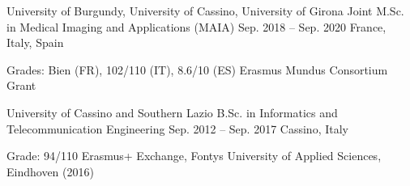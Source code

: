 

\begin{cventries}

  \cventry
    {University of Burgundy, University of Cassino, University of Girona} %
    {Joint M.Sc. in Medical Imaging and Applications (MAIA)} %
    {Sep. 2018 -- Sep. 2020}
    {France, Italy, Spain}
    {
      \begin{cvitems}
        \item {Grades: Bien (FR), 102/110 (IT), 8.6/10 (ES) \textbullet{} Erasmus Mundus Consortium Grant}
      \end{cvitems}
    }

  \cventry
    {University of Cassino and Southern Lazio} %
    {B.Sc. in Informatics and Telecommunication Engineering} %
    {Sep. 2012 -- Sep. 2017}
    {Cassino, Italy}
    {
      \begin{cvitems}
        \item {Grade: 94/110 \textbullet{} Erasmus+ Exchange, Fontys University of Applied Sciences, Eindhoven (2016)}
      \end{cvitems}
    }

\end{cventries}
